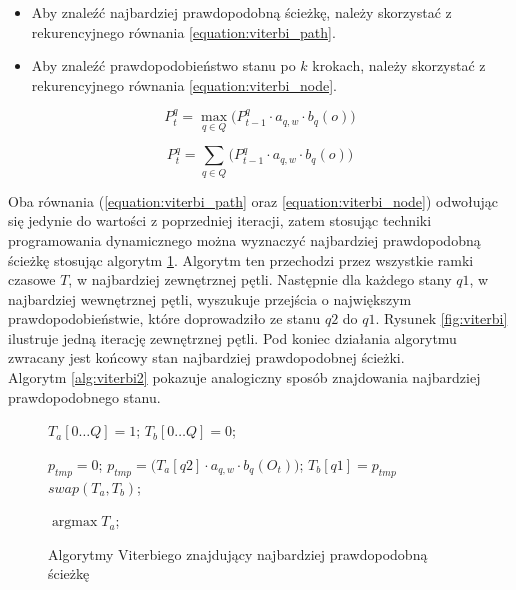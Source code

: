\documentclass[11pt]{article}
\DeclareMathOperator*{\argmax}{\arg\max}   %
\begin{document}
		   \begin{itemize}
			   	\item Aby znaleźć najbardziej prawdopodobną ścieżkę, należy skorzystać z rekurencyjnego równania \ref{equation:viterbi_path}.
			   	\item Aby znaleźć prawdopodobieństwo stanu po $k$ krokach, należy skorzystać z rekurencyjnego równania \ref{equation:viterbi_node}.
		   \end{itemize}
	   	   
		   \begin{equation}
		   P_t^q=\max_{q \in Q} \bigg( P_{t-1}^q\cdot a_{q,w}\cdot b_q(o) \bigg)
		   \label{equation:viterbi_path}
		   \end{equation}
		   
		   \begin{equation}
		   P_t^q=\sum_{q \in Q} \bigg( P_{t-1}^q\cdot a_{q,w}\cdot b_q(o) \bigg)
		   \label{equation:viterbi_node}
		   \end{equation}
		   
		  Oba równania (\ref{equation:viterbi_path} oraz \ref{equation:viterbi_node}) odwołując się jedynie do wartości z poprzedniej iteracji, zatem stosując techniki programowania dynamicznego można wyznaczyć najbardziej prawdopodobną ścieżkę stosując algorytm \ref{alg:viterbi}. Algorytm ten przechodzi przez wszystkie ramki czasowe $T$, w najbardziej zewnętrznej pętli. Następnie dla każdego stany $q1$, w najbardziej wewnętrznej pętli, wyszukuje przejścia o największym prawdopodobieństwie, które doprowadziło ze stanu $q2$ do $q1$. Rysunek \ref{fig:viterbi} ilustruje jedną iterację zewnętrznej pętli. Pod koniec działania algorytmu zwracany jest końcowy stan najbardziej prawdopodobnej ścieżki. \\
		  Algorytm \ref{alg:viterbi2} pokazuje analogiczny sposób znajdowania najbardziej prawdopodobnego stanu.
		
		  \begin{figure}
			   \begin{algorithmic}[1]
				   	
					   	
					   	\STATE $T_a[0 \ldots Q] = 1$;
					   	\STATE $T_b[0 \ldots Q] = 0$;
					   	
							   	\STATE $p_{tmp} = 0$;
									   	\STATE $p_{tmp} = \bigg( T_a[q2]\cdot a_{q,w}\cdot b_q(O_t) \bigg)$;
								   	\ENDIF
							   	\ENDFOR
							   	\STATE $T_b[q1] = p_{tmp}$
						   	\ENDFOR
						   	\STATE $swap(T_a, T_b)$;
					   	\ENDFOR
					   	
					   	\RETURN $\argmax{T_a}$;
			   \end{algorithmic}
		  \caption{Algorytmy Viterbiego znajdujący najbardziej prawdopodobną ścieżkę}
		  \label{alg:viterbi}
		  \end{figure}		
	  
\end{document}
